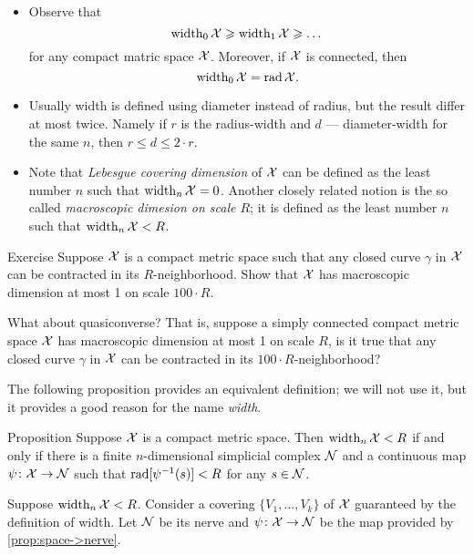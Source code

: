\begin{itemize}
\item Observe that 
\[\operatorname{\rm width}\nolimits_0\mathcal{X}\geqslant\operatorname{\rm width}\nolimits_1\mathcal{X}\geqslant\dots\]
for any compact matric space $\mathcal{X}$.
Moreover, if $\mathcal{X}$ is connected, then 
\[\operatorname{\rm width}\nolimits_0\mathcal{X}=\mathop{\rm rad}\nolimits\mathcal{X}.\]
\item 
Usually width is defined using diameter instead of radius, but the result differ at most twice.
Namely if $r$ is the radius-width and $d$ --- diameter-width for the same $n$, then 
$r\le d\le 2\cdot r$.

\item Note that \emph{Lebesgue covering dimension} of $\mathcal{X}$ can be defined as the least number $n$ such that $\operatorname{\rm width}\nolimits_n\mathcal{X}=0$.
Another closely related notion is the so called \emph{macroscopic dimesion on scale $R$};
it is defined as the  least number $n$ such that $\operatorname{\rm width}\nolimits_n\mathcal{X}<R$.
\end{itemize}

\begin{thm}{Exercise}\label{ex:macrodimension}
Suppose $\mathcal{X}$ is a compact metric space such that any closed curve $\gamma$ in $\mathcal{X}$ can be contracted in its $R$-neighborhood.
Show that $\mathcal{X}$ has macroscopic dimension at most 1 on scale $100\cdot R$.

What about quasiconverse? That is, suppose a simply connected compact metric space $\mathcal{X}$ has macroscopic dimension at most 1 on scale $R$, is it true that any closed curve $\gamma$ in $\mathcal{X}$ can be contracted in its $100\cdot R$-neighborhood?
\end{thm}


The following proposition provides an equivalent definition;
we will not use it, but it provides a good reason for the name \emph{width}.

\begin{thm}{Proposition}\label{prop:width=suprad(inv)}
Suppose $\mathcal{X}$ is a compact metric space.
Then $\operatorname{\rm width}\nolimits_n\mathcal{X}<R$ if and only if there is a finite $n$-dimensional simplicial complex $\mathcal{N}$ and a continuous map $\psi\colon\mathcal{X}\to \mathcal{N}$
such that $\rad[\psi^{-1}(s)]\z<R$
for any $s\in \mathcal{N}$.
\end{thm}

Suppose $\operatorname{\rm width}\nolimits_n\mathcal{X}<R$.
Consider a covering $\{V_1,\dots,V_k\}$ of $\mathcal{X}$ guaranteed by the definition of width.
Let $\mathcal{N}$ be its nerve and $\psi\colon\mathcal{X}\to \mathcal{N}$ be the map provided by \ref{prop:space->nerve}.


